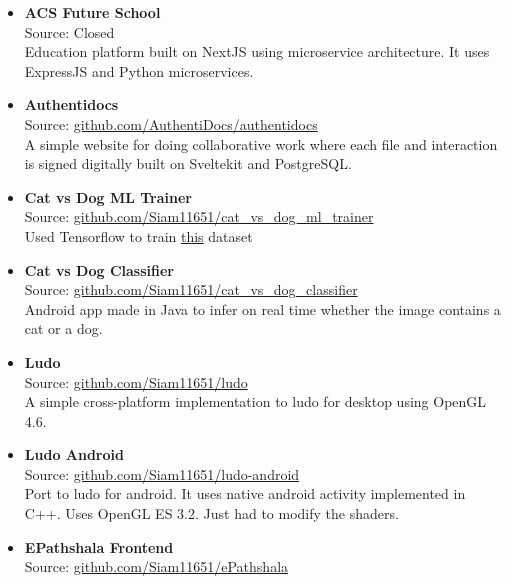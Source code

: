 
\begin{itemize}
  \item {
    \textbf{ACS Future School} \\
    Source: Closed \\
    Education platform built on NextJS using microservice architecture. It uses ExpressJS and Python microservices.
  }
  \item {
      \textbf{Authentidocs} \\
      Source: \href{https://github.com/AuthentiDocs/authentidocs}{github.com/AuthentiDocs/authentidocs} \\
      A simple website for doing collaborative work where each file and interaction is signed digitally built on Sveltekit and PostgreSQL.
    }
  \item {
      \textbf{Cat vs Dog ML Trainer} \\
      Source: \href{https://github.com/Siam11651/cat_vs_dog_ml_trainer}{github.com/Siam11651/cat\_vs\_dog\_ml\_trainer} \\
      Used Tensorflow to train \href{https://www.kaggle.com/competitions/dogs-vs-cats}{this} dataset
    }
  \item {
    \textbf{Cat vs Dog Classifier} \\
    Source: \href{https://github.com/Siam11651/cat_vs_dog_classifier}{github.com/Siam11651/cat\_vs\_dog\_classifier} \\
    Android app made in Java to infer on real time whether the image contains a cat or a dog.
  }
  \item {
    \textbf{Ludo} \\
    Source: \href{https://github.com/Siam11651/ludo}{github.com/Siam11651/ludo} \\
    A simple cross-platform implementation to ludo for desktop using OpenGL 4.6.
  }
  \item {
    \textbf{Ludo Android} \\
    Source: \href{https://github.com/Siam11651/ludo-android}{github.com/Siam11651/ludo-android} \\
    Port to ludo for android. It uses native android activity implemented in C++. Uses OpenGL ES 3.2. Just had to modify the shaders.
  }
  \item {
    \textbf{EPathshala Frontend} \\
    Source: \href{https://github.com/Siam11651/ePathshala}{github.com/Siam11651/ePathshala} \\
}
\end{itemize}

